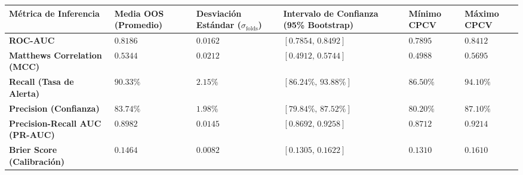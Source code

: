 \documentclass[
  12pt,
]{article}
\newcounter{none} %
\begin{document}
{\def\LTcaptype{none} %
\begin{longtable}[]{@{}
  >{\raggedright\arraybackslash}p{}
  >{\centering\arraybackslash}p{}
  >{\centering\arraybackslash}p{}
  >{\centering\arraybackslash}p{}
  >{\centering\arraybackslash}p{}
  >{\centering\arraybackslash}p{}@{}}
\toprule\noalign{}
\begin{minipage}[b]{\linewidth}\raggedright
Métrica de Inferencia
\end{minipage} & \begin{minipage}[b]{\linewidth}\centering
Media OOS (Promedio)
\end{minipage} & \begin{minipage}[b]{\linewidth}\centering
Desviación Estándar (\(\sigma_{\text{folds}}\))
\end{minipage} & \begin{minipage}[b]{\linewidth}\centering
Intervalo de Confianza (95\% Bootstrap)
\end{minipage} & \begin{minipage}[b]{\linewidth}\centering
Mínimo CPCV
\end{minipage} & \begin{minipage}[b]{\linewidth}\centering
Máximo CPCV
\end{minipage} \\
\midrule\noalign{}
\endhead
\bottomrule\noalign{}
\endlastfoot
\textbf{ROC-AUC} & \(0.8186\) & \(0.0162\) & \([0.7854, \, 0.8492]\) &
\(0.7895\) & \(0.8412\) \\
\textbf{Matthews Correlation (MCC)} & \(0.5344\) & \(0.0212\) &
\([0.4912, \, 0.5744]\) & \(0.4988\) & \(0.5695\) \\
\textbf{Recall (Tasa de Alerta)} & \(90.33\%\) & \(2.15\%\) &
\([86.24\%, \, 93.88\%]\) & \(86.50\%\) & \(94.10\%\) \\
\textbf{Precision (Confianza)} & \(83.74\%\) & \(1.98\%\) &
\([79.84\%, \, 87.52\%]\) & \(80.20\%\) & \(87.10\%\) \\
\textbf{Precision-Recall AUC (PR-AUC)} & \(0.8982\) & \(0.0145\) &
\([0.8692, \, 0.9258]\) & \(0.8712\) & \(0.9214\) \\
\textbf{Brier Score (Calibración)} & \(0.1464\) & \(0.0082\) &
\([0.1305, \, 0.1622]\) & \(0.1310\) & \(0.1610\) \\
\end{longtable}
}
\end{document}
